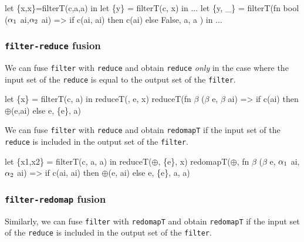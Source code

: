 \begin{colorcode}
let \{x,x\}=filterT(c,a,a) in
let \{y\} = filterT(c, x) in
...
    \emphh{\mymath{\Downarrow}}
let \{y, _\} = filterT(fn bool (\(\alpha_{1}\) ai,\(\alpha_{2}\) ai) =>
                       if   c(ai, ai)
                       then c(ai)
                       else False,
                     a, a ) in
...
\end{colorcode}

\subsubsection{\texttt{filter-reduce} fusion}

We can fuse \texttt{filter} with \texttt{reduce} and obtain
\texttt{reduce} \textit{only} in the case where the input set of the
\texttt{reduce} is equal to the output set of the \texttt{filter}.

\begin{colorcode}
let \{x\} = filterT(c, a) in
reduceT(\mymath{\oplus}, e, x)
    \emphh{\mymath{\Downarrow}}
reduceT(fn \(\beta\) (\(\beta\) e, \(\beta\) ai) =>
          if c(ai) then \(\oplus\)(e,ai) else e,
        \{e\}, a)
\end{colorcode}

We can fuse \texttt{filter} with \texttt{reduce} and obtain
\texttt{redomapT} if the input set of the \texttt{reduce} is included
in the output set of the \texttt{filter}.

\begin{colorcode}
let \{x1,x2\} = filterT(c, a, a)
in  reduceT(\(\oplus\), \{e\}, x)
    \emphh{\mymath{\Downarrow}}
redomapT(\(\oplus\),
         fn \(\beta\) (\(\beta\) e, \(\alpha_{1}\) ai, \(\alpha_{2}\) ai) =>
           if c(ai, ai)
           then \(\oplus\)(e, ai)
           else e,
         \{e\}, a, a)
\end{colorcode}

\subsubsection{\texttt{filter-redomap} fusion}

Similarly, we can fuse \texttt{filter} with \texttt{redomapT} and
obtain \texttt{redomapT} if the input set of the \texttt{reduce} is
included in the output set of the \texttt{filter}.

